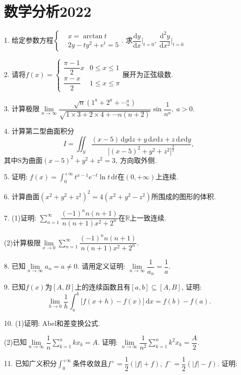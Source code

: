 \documentclass[12pt, a4paper, twoside]{ctexart}%
\newcommand{\rmd}{\mathrm{d}} %
\begin{document}
	\section{数学分析2022}
	1. 给定参数方程$\left\{\begin{aligned}
		&x=\arctan t\\
		&2y-ty^2+e^t=5
	\end{aligned}\right.$. 求$\dfrac{\rmd y}{\rmd x}\Big|_{t=0},\ \dfrac{\rmd^2 y}{\rmd x^2}\Big|_{t=0}$\par
	2. 请将$f(x)=\begin{cases}
		\dfrac{\pi-1}{2}x &0\leq x \leq1\\
		\dfrac{\pi-x}{2} &1\leq x\leq \pi
	\end{cases}$展开为正弦级数.\par
	3. 计算极限$\lim\limits_{n\rightarrow\infty}\dfrac{\sqrt{n}(1^a+2^a+\cdots_n^a)}{\sqrt{1\times3+2\times4+\cdots n(n+2)}}\sin\dfrac{1}{n^a},\ a>0.$\par 
	4. 计算第二型曲面积分\[I=\iint_{S}\dfrac{(x-5)\,\rmd y\rmd z+y\,\rmd x\rmd z+z\,\rmd x\rmd y}{\big[(x-5)^2+y^2+z^2\big]^\frac{3}{2}},\]
	其中S为曲面$(x-5)^2+y^2+z^2=3,\ $方向取外侧. \par
	5. 证明: $f(x)=\int_0^{+\infty}t^{x-1}e^{-t}\ln t\,\rmd t\mbox{在}(0,+\infty)$上连续. \par 
	6. 计算曲面$(x^2+y^2+z^2)^2=4(x^2+y^2-z^2)$所围成的图形的体积.\par
	7. (1)证明: $\sum\limits_{n=1}^{\infty}\dfrac{(-1)^n n(n+1)}{n(n+1)x^2+2^n}\mbox{在}\mathbb{R}$上一致连续.\par
	\hspace{1.2em}(2)计算极限$\lim\limits_{x\rightarrow0}\sum\limits_{n=1}^\infty\dfrac{(-1)^n n(n+1)}{n(n+1)x^2+2^n}$.\par 
	8. 已知$\lim\limits_{n\rightarrow\infty}a_n=a\neq0$. 请用定义证明: $\lim\limits_{n\rightarrow\infty}\dfrac{1}{a_n}=\dfrac{1}{a}$.\par 
	9. 已知$f(x)$为$[A,B]$上的连续函数且有$[a,b]\subseteq[A,B]$, 证明:\[
	\lim\limits_{h\rightarrow0}\dfrac{1}{h}\int_a^b\Big[f(x+h)-f(x)\Big]\,\rmd x=f(b)-f(a).\]\par 
	10. (1)证明: Abel和差变换公式.\par 
	\hspace{1.7em}(2)已知$\lim\limits_{n\rightarrow\infty}\dfrac{1}{n}\sum\limits_{k=1}^n kx_k=A$. 证明: $\lim\limits_{n\rightarrow\infty}\dfrac{1}{n^2}\sum\limits_{k=1}^n k^2x_k=\dfrac{A}{2}$.\par 
	11. 已知广义积分$\int_0^{+\infty}$条件收敛且$f^+=\dfrac{1}{2}(|f|+f),\ f^-=\dfrac{1}{2}(|f|-f)$. 证明: \par
\end{document}
